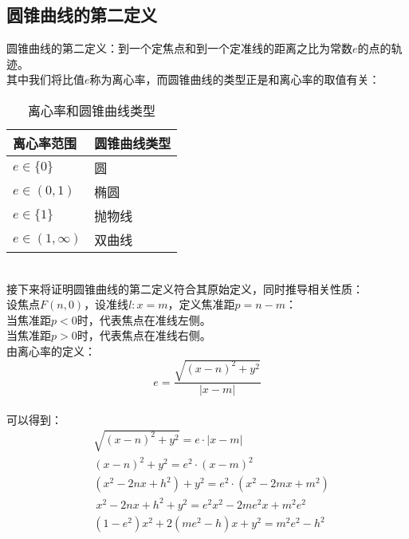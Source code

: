 \documentclass[UTF8]{ctexart}
\begin{document}
\newpage

\subsection{圆锥曲线的第二定义}
    圆锥曲线的第二定义：到一个定焦点和到一个定准线的距离之比为常数$e$的点的轨迹。\\[3mm]
    其中我们将比值$e$称为离心率，而圆锥曲线的类型正是和离心率的取值有关：\vspace{5pt}
    \setcounter{equation}{0}
    \begin{table}[h]
        \begin{center}
            \begin{tabular}{l|l}
                \hline
                离心率范围\qquad\qquad\qquad\qquad&圆锥曲线类型\qquad\qquad\qquad\qquad\\ \hline
                $e\in\{ 0 \}$&圆\\ \hline
                $e\in(0,1)$&椭圆\\ \hline
                $e\in\{ 1 \}$&抛物线\\ \hline
                $e\in(1,\infty)$&双曲线\\ \hline
            \end{tabular}
            \caption{离心率和圆锥曲线类型}
        \end{center}
    \end{table}\\
    接下来将证明圆锥曲线的第二定义符合其原始定义，同时推导相关性质：\\[3mm]
    设焦点$F(n,0)$，设准线$l:x=m$，定义焦准距$p=n-m$：\\[3mm]
    当焦准距$p<0$时，代表焦点在准线左侧。\\[2mm]
    当焦准距$p>0$时，代表焦点在准线右侧。\\[6mm]
    由离心率的定义：
    \setcounter{equation}{0}
    \begin{equation}
        e=\frac{\sqrt{(x-n)^2+y^2}}{|x-m|}
    \end{equation}\\[1mm]
    可以得到：
    \begin{align}
        &\sqrt{(x-n)^2+y^2}=e\cdot|x-m|\\[3mm]
        &(x-n)^2+y^2=e^2\cdot(x-m)^2\\[3mm]
        &(x^2-2nx+h^2)+y^2=e^2\cdot\left(x^2-2mx+m^2\right)\\[3mm]
        &~x^2-2nx+h^2+y^2=e^2x^2-2me^2x+m^2e^2\\[3mm]
        &\left(1-e^2\right)x^2+2\left(me^2-h\right)x+y^2=m^2e^2-h^2
    \end{align}
\end{document}
